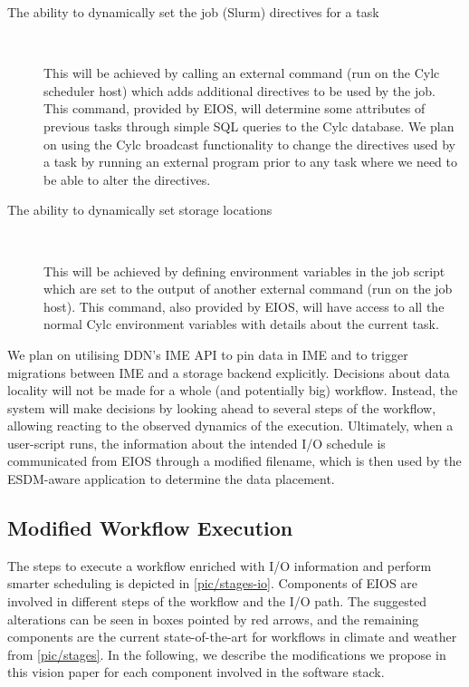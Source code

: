 \documentclass{superfri}
\begin{document}
\begin{description}

\item[The ability to dynamically set the job (Slurm) directives for a task]

\ \\ \vspace{-0.5cm}

This will be achieved by calling an external command (run on the Cylc scheduler host) which adds additional directives to be used by the job.
This command, provided by EIOS, will determine some attributes of previous tasks through simple SQL queries to the Cylc database.
We plan on using the Cylc broadcast functionality to change the directives used by a task by running an external program prior to any task where we need to be able to alter the directives.

\item[The ability to dynamically set storage locations]

\ \\ \vspace{-0.5cm}

This will be achieved by defining environment variables in the job script which are set to the output of another external command (run on the job host).
This command, also provided by EIOS, will have access to all the normal Cylc environment variables with details about the current task.
\end{description}

We plan on utilising DDN's IME API to pin data in IME and to trigger migrations between IME and a storage backend explicitly.
Decisions about data locality will not be made for a whole (and potentially big) workflow.
Instead, the system will make decisions by looking ahead to several steps of the workflow, allowing reacting to the observed dynamics of the execution.
Ultimately, when a user-script runs, the information about the intended I/O schedule is communicated from EIOS through a modified filename, which is then used by the ESDM-aware application to determine the data placement.

\subsection{Modified Workflow Execution}

The steps to execute a workflow enriched with I/O information and perform smarter scheduling is depicted in \cref{pic/stages-io}.
Components of EIOS are involved in different steps of the workflow and the I/O path.
The suggested alterations can be seen in boxes pointed by red arrows, and the remaining components are the current state-of-the-art for workflows in climate and weather from \cref{pic/stages}.
In the following, we describe the modifications we propose in this vision paper for each component involved in the software stack.
\end{document}
